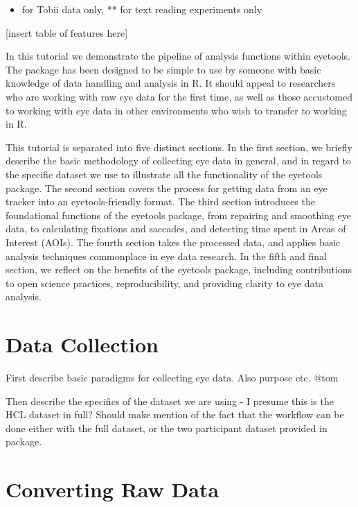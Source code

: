 \documentclass[
  man,
  floatsintext,
  longtable,
  nolmodern,
  notxfonts,
  notimes,
  colorlinks=true,linkcolor=blue,citecolor=blue,urlcolor=blue]{apa7}
\providecommand{\tightlist}{%
  \setlength{\itemsep}{0pt}\setlength{\parskip}{0pt}}
\begin{document}
\begin{itemize}
\tightlist
\item
  for Tobii data only, ** for text reading experiments only
\end{itemize}

{[}insert table of features here{]}

In this tutorial we demonstrate the pipeline of analysis functions
within eyetools. The package has been designed to be simple to use by
someone with basic knowledge of data handling and analysis in R. It
should appeal to researchers who are working with raw eye data for the
first time, as well as those accustomed to working with eye data in
other environments who wish to transfer to working in R.

This tutorial is separated into five distinct sections. In the first
section, we briefly describe the basic methodology of collecting eye
data in general, and in regard to the specific dataset we use to
illustrate all the functionality of the eyetools package. The second
section covers the process for getting data from an eye tracker into an
eyetools-friendly format. The third section introduces the foundational
functions of the eyetools package, from repairing and smoothing eye
data, to calculating fixations and saccades, and detecting time spent in
Areas of Interest (AOIs). The fourth section takes the processed data,
and applies basic analysis techniques commonplace in eye data research.
In the fifth and final section, we reflect on the benefits of the
eyetools package, including contributions to open science practices,
reproducibility, and providing clarity to eye data analysis.

\section{Data Collection}\label{data-collection}

First describe basic paradigms for collecting eye data. Also purpose
etc. @tom

Then describe the specifics of the dataset we are using - I presume this
is the HCL dataset in full? Should make mention of the fact that the
workflow can be done either with the full dataset, or the two
participant dataset provided in package.

\section{Converting Raw Data}\label{converting-raw-data}
\end{document}
